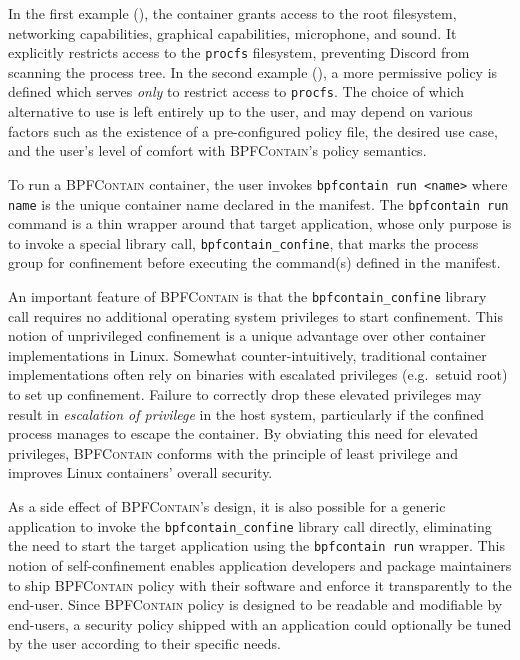 \documentclass[dvipsnames, 12pt]{article}
\def\bpfcontain{\textsc{BPFContain}}
\begin{document}
In the first example (), the container grants access to the
root filesystem, networking capabilities, graphical capabilities, microphone,
and sound. It explicitly restricts access to the \texttt{procfs} filesystem,
preventing Discord from scanning the process tree. In the second example
(), a more permissive policy is defined which serves
\textit{only} to restrict access to \texttt{procfs}. The choice of which
alternative to use is left entirely up to the user, and may depend on various
factors such as the existence of a pre-configured policy file, the desired use
case, and the user's level of comfort with \bpfcontain{}'s policy semantics.

To run a \bpfcontain{} container, the user invokes \texttt{bpfcontain run <name>} where
\texttt{name} is the unique container name declared in the manifest.  The
\texttt{bpfcontain run} command is a thin wrapper around that target application,
whose only purpose is to invoke a special library call,
\lstinline[language=c]|bpfcontain_confine|, that marks the process group for
confinement before executing the command(s) defined in the manifest.

An important feature of \bpfcontain{} is that the
\lstinline[language=c]|bpfcontain_confine| library call requires no additional
operating system privileges to start confinement.  This notion of unprivileged
confinement is a unique advantage over other container implementations in Linux.
Somewhat counter-intuitively, traditional container implementations often rely
on binaries with escalated privileges (e.g.~setuid root) to set up confinement.
Failure to correctly drop these elevated privileges may result in
\textit{escalation of privilege} in the host system, particularly if the
confined process manages to escape the container.  By obviating this need for
elevated privileges, \bpfcontain{} conforms with the principle of least
privilege and improves Linux containers' overall security.

As a side effect of \bpfcontain{}'s design, it is also possible for a generic
application to invoke the \lstinline[language=c]|bpfcontain_confine| library
call directly, eliminating the need to start the target application using the
\texttt{bpfcontain run} wrapper. This notion of self-confinement enables
application developers and package maintainers to ship \bpfcontain{} policy with
their software and enforce it transparently to the end-user. Since \bpfcontain{}
policy is designed to be readable and modifiable by end-users, a security policy
shipped with an application could optionally be tuned by the user according to
their specific needs.
\end{document}
